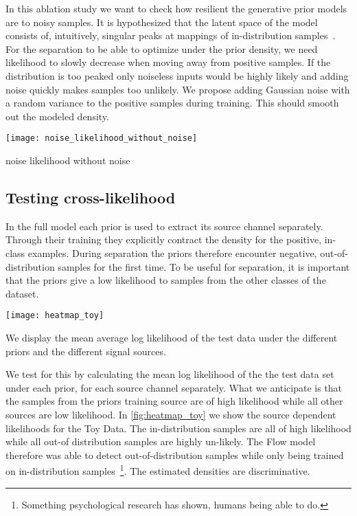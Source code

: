 In this ablation study we want to check how resilient the generative prior models are to noisy samples. It is hypothesized that the latent space of the model consists of, intuitively, singular peaks at mappings of in-distribution samples~\cite{jayaramSource2020}. For the separation to be able to optimize under the prior density, we need likelihood to slowly decrease when moving away from positive samples. If the distribution is too peaked only noiseless inputs would be highly likely and adding noise quickly makes samples too unlikely. We propose adding Gaussian noise with a random variance to the positive samples during training. This should smooth out the modeled density.

\begin{marginfigure}
    \texttt{[image: noise\_likelihood\_without\_noise]}%
    \caption{noise likelihood without noise}%
    \label{fig:noise_ll_without_noise}
\end{marginfigure}

\subsection{Testing cross-likelihood}
In the full model each prior is used to extract its source channel separately. Through their training they explicitly contract the density for the positive, in-class examples. During separation the priors therefore encounter negative, out-of-distribution samples for the first time. To be useful for separation, it is important that the priors give a low likelihood to samples from the other classes of the dataset.

\begin{marginfigure}
    \texttt{[image: heatmap\_toy]}%
    \caption{We display the mean average log likelihood of the test data under the different priors and the different signal sources.}%
    \label{fig:heatmap_toy}
\end{marginfigure}

We test for this by calculating the mean log likelihood of the the test data set under each prior, for each source channel separately. What we anticipate is that the samples from the priors training source are of high likelihood while all other sources are low likelihood. In \cref{fig:heatmap_toy} we show the source dependent likelihoods for the Toy Data. The in-distribution samples are all of high likelihood while all out-of distribution samples are highly un-likely. The Flow model therefore was able to detect out-of-distribution samples while only being trained on in-distribution samples~\footnote{Something psychological research has shown, humans being able to do.}. The estimated densities are discriminative.

